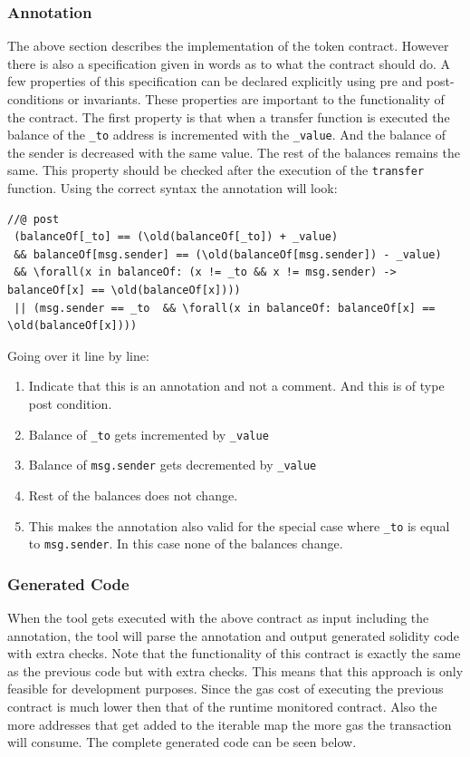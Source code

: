 \documentclass[a4paper]{article}
\begin{document}
\subsubsection{Annotation}
The above section describes the implementation of the token contract. However there is also a specification given in words as to what the contract should do. A few properties of this specification can be declared explicitly using pre and post-conditions or invariants. These properties are important to the functionality of the contract. 
The first property is that when a transfer function is executed the balance of the \texttt{\_to} address is incremented with the \texttt{\_value}. And the balance of the sender is decreased with the same value. The rest of the balances remains the same. This property should be checked after the execution of the \texttt{transfer} function. Using the correct syntax the annotation will look:
\begin{lstlisting}[basicstyle=\ttfamily, breaklines=true ]
//@ post 
 (balanceOf[_to] == (\old(balanceOf[_to]) + _value) 
 && balanceOf[msg.sender] == (\old(balanceOf[msg.sender]) - _value) 
 && \forall(x in balanceOf: (x != _to && x != msg.sender) -> balanceOf[x] == \old(balanceOf[x]))) 
 || (msg.sender == _to  && \forall(x in balanceOf: balanceOf[x] == \old(balanceOf[x])))
\end{lstlisting}
Going over it line by line:
\begin{enumerate}
  \item Indicate that this is an annotation and not a comment. And this is of type post condition.
  \item Balance of \texttt{\_to} gets incremented by \texttt{\_value}
  \item Balance of \texttt{msg.sender} gets decremented by \texttt{\_value}
  \item Rest of the balances does not change.
  \item This makes the annotation also valid for the special case where \texttt{\_to} is equal to \texttt{msg.sender}. In this case none of the balances change.
\end{enumerate}

\subsubsection{Generated Code}
When the tool gets executed with the above contract as input including the annotation, the tool will parse the annotation and output generated solidity code with extra checks. Note that the functionality of this contract is exactly the same as the previous code but with extra checks. This means that this approach is only feasible for development purposes. Since the gas cost of executing the previous contract is much lower then that of the runtime monitored contract. Also the more addresses that get added to the iterable map the more gas the transaction will consume. The complete generated code can be seen below.

\end{document}
